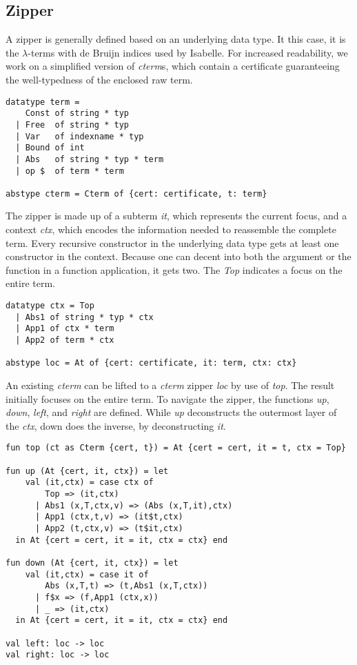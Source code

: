\documentclass[12pt,a4paper]{article}
\newcommand{\type}[1]{\textit{#1}}
\newcommand{\constructor}[1]{\textit{#1}}
\newcommand{\recordentry}[1]{\textit{#1}}
\newcommand{\function}[1]{\textit{#1}}
\begin{document}
\subsection*{Zipper}

A zipper is generally defined based on an underlying data type.
It this case, it is the $\lambda$-terms with de Bruijn indices used by Isabelle.
For increased readability, we work on a simplified version of \type{cterm}s, which contain a certificate guaranteeing the well-typedness of the enclosed raw term.

\begin{lstlisting}
datatype term =
    Const of string * typ
  | Free  of string * typ
  | Var   of indexname * typ
  | Bound of int
  | Abs   of string * typ * term
  | op $  of term * term

abstype cterm = Cterm of {cert: certificate, t: term}
\end{lstlisting}

The zipper is made up of a subterm \recordentry{it}, which represents the current focus, and a context \recordentry{ctx}, which encodes the information needed to reassemble the complete term.
Every recursive constructor in the underlying data type gets at least one constructor in the context.
Because one can decent into both the argument or the function in a function application, it gets two.
The \constructor{Top} indicates a focus on the entire term.

\begin{lstlisting}
datatype ctx = Top
  | Abs1 of string * typ * ctx
  | App1 of ctx * term
  | App2 of term * ctx

abstype loc = At of {cert: certificate, it: term, ctx: ctx}
\end{lstlisting}

An existing \type{cterm} can be lifted to a \type{cterm} zipper \type{loc} by use of \function{top}.
The result initially focuses on the entire term.
To navigate the zipper, the functions \function{up}, \function{down}, \function{left}, and \function{right} are defined.
While \function{up} deconstructs the outermost layer of the \recordentry{ctx}, down does the inverse, by deconstructing \recordentry{it}.

\begin{lstlisting}
fun top (ct as Cterm {cert, t}) = At {cert = cert, it = t, ctx = Top}

fun up (At {cert, it, ctx}) = let
    val (it,ctx) = case ctx of
        Top => (it,ctx)
      | Abs1 (x,T,ctx,v) => (Abs (x,T,it),ctx)
      | App1 (ctx,t,v) => (it$t,ctx)
      | App2 (t,ctx,v) => (t$it,ctx)
  in At {cert = cert, it = it, ctx = ctx} end

fun down (At {cert, it, ctx}) = let
    val (it,ctx) = case it of
        Abs (x,T,t) => (t,Abs1 (x,T,ctx))
      | f$x => (f,App1 (ctx,x))
      | _ => (it,ctx)
  in At {cert = cert, it = it, ctx = ctx} end

val left: loc -> loc
val right: loc -> loc
\end{lstlisting}
\end{document}
